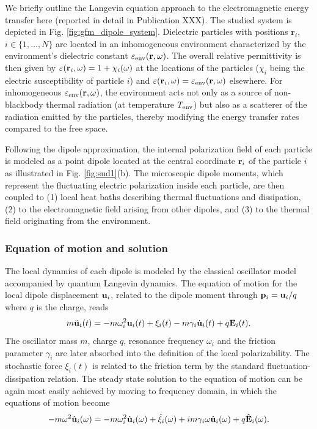 We briefly outline the Langevin equation approach to the electromagnetic energy transfer here (reported in detail in Publication XXX). The studied system is depicted in Fig. \ref{fig:gfm_dipole_system}. Dielectric particles with positions $\mathbf{r}_i$, $i\in\{1,\dots,N\}$ are located in an inhomogeneous environment characterized by the environment's dielectric constant $\varepsilon_{\textrm{env}}(\mathbf{r},\omega)$. The overall relative permittivity is then given by $\varepsilon(\mathbf{r}_i,\omega)=1+\chi_i(\omega)$ at the locations of the particles ($\chi_i$ being the electric susceptibility of particle $i$) and $\varepsilon(\mathbf{r}_i,\omega)=\varepsilon_{\textrm{env}}(\mathbf{r},\omega)$ elsewhere. For inhomogeneous $\varepsilon_{\textrm{env}}(\mathbf{r},\omega)$, the environment acts not only as a source of non-blackbody thermal radiation (at temperature $T_{\textrm{env}}$) but also as a scatterer of the radiation emitted by the particles, thereby modifying the energy transfer rates compared to the free space.

Following the dipole approximation, the internal polarization field of each particle is modeled as a point dipole located at the central coordinate $\mathbf{r}_i$ of the particle $i$ as illustrated in Fig. \ref{fig:sud1}(b). The microscopic dipole moments, which represent the fluctuating electric polarization inside each particle, are then coupled to (1) local heat baths describing thermal fluctuations and dissipation, (2) to the electromagnetic field arising from other dipoles, and (3) to the thermal field originating from the environment.

\subsubsection{Equation of motion and solution}

The local dynamics of each dipole is modeled by the classical oscillator model accompanied by quantum Langevin dynamics. The equation of motion for the local dipole displacement $\mathbf{u}_i$, related to the dipole moment through $\mathbf{p}_i=\mathbf{u}_i/q$ where $q$ is the charge, reads
 \begin{equation}
 m\ddot{\mathbf{u}}_i(t) = -m\omega_i^2 \mathbf{u}_i(t) +\xi_i(t) -m\gamma_i \dot{\mathbf{u}}_i(t)  + q \mathbf{E}_i(t). \label{eq:gfm_eom1}
\end{equation}
The oscillator mass $m$, charge $q$, resonance frequency $\omega_i$ and the friction parameter $\gamma_i$ are later absorbed into the definition of the local polarizability. The stochastic force $\xi_i(t)$ is related to the friction term by the standard fluctuation-dissipation relation. The steady state solution to the equation of motion can be again most easily achieved by moving to frequency domain, in which the equations of motion become
\begin{equation}
 -m\omega^2 \hat{\mathbf{u}}_i(\omega) = -m\omega_i^2 \hat{\mathbf{u}}_i(\omega) +\hat \xi_i(\omega) +im\gamma_i \omega \hat {\mathbf{u}}_i(\omega)  + q \hat {\mathbf{E}}_i(\omega). \label{eq:gfm_eom2}
\end{equation}

